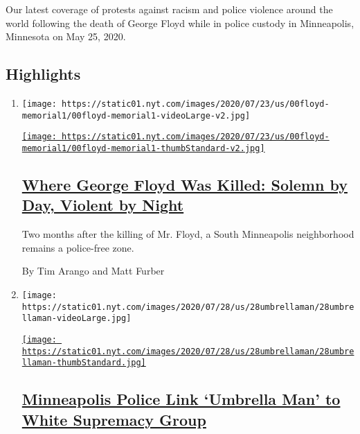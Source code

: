 Our latest coverage of protests against racism and police violence
around the world following the death of George Floyd while in police
custody in Minneapolis, Minnesota on May 25, 2020.

\hypertarget{highlights}{%
\subsection{Highlights}\label{highlights}}

\begin{enumerate}
\def\labelenumi{\arabic{enumi}.}
\item
  \texttt{[image: https://static01.nyt.com/images/2020/07/23/us/00floyd-memorial1/00floyd-memorial1-videoLarge-v2.jpg]}

  \href{/2020/07/29/us/george-floyd-memorial.html}{\texttt{[image: https://static01.nyt.com/images/2020/07/23/us/00floyd-memorial1/00floyd-memorial1-thumbStandard-v2.jpg]}}

  \hypertarget{where-george-floyd-was-killed-solemn-by-day-violent-by-night}{%
  \subsection{\texorpdfstring{\href{/2020/07/29/us/george-floyd-memorial.html}{Where
  George Floyd Was Killed: Solemn by Day, Violent by
  Night}}{Where George Floyd Was Killed: Solemn by Day, Violent by Night}}\label{where-george-floyd-was-killed-solemn-by-day-violent-by-night}}

  Two months after the killing of Mr. Floyd, a South Minneapolis
  neighborhood remains a police-free zone.

  By Tim Arango and Matt Furber
\item
  \texttt{[image: https://static01.nyt.com/images/2020/07/28/us/28umbrellaman/28umbrellaman-videoLarge.jpg]}

  \href{/2020/07/28/us/umbrella-man-identified-minneapolis.html}{\texttt{[image: https://static01.nyt.com/images/2020/07/28/us/28umbrellaman/28umbrellaman-thumbStandard.jpg]}}

  \hypertarget{minneapolis-police-link-umbrella-man-to-white-supremacy-group}{%
  \subsection{\texorpdfstring{\href{/2020/07/28/us/umbrella-man-identified-minneapolis.html}{Minneapolis
  Police Link `Umbrella Man' to White Supremacy
  Group}}{Minneapolis Police Link `Umbrella Man' to White Supremacy Group}}\label{minneapolis-police-link-umbrella-man-to-white-supremacy-group}}


\end{enumerate}
